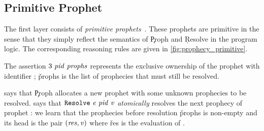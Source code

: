 \subsection{Primitive Prophet}
\label{sec:prophecy_primitive}



The first layer consists of \emph{primitive prophets}~.
These prophets are primitive in the sense that they simply reflect the semantics of \c{Proph} and \c{Resolve} in the program logic.
The corresponding reasoning rules are given in \cref{fig:prophecy_primitive}.

The assertion $\model\ \zooProph\ \v{prophs}$ represents the exclusive ownership of the prophet with identifier \zooProph; \v{prophs} is the list of prophecies that must still be resolved.

 says that \c{Proph} allocates a new prophet with some unknown prophecies to be resolved.
 says that $\c{Resolve}\ \zooExpr\ \zooProph\ \zooVal$ \emph{atomically} resolves the next prophecy of prophet \zooProph: we learn that the prophecies before resolution \v{prophs} is non-empty and its head is the pair $(\v{res}, \zooVal)$ where \v{res} is the evaluation of \zooExpr.
